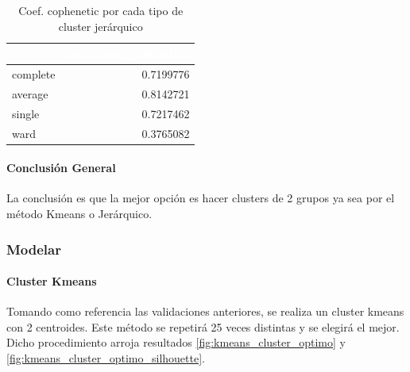 \begin{table}[!h]
	
	\caption{\label{tab:tabla_cophenetic_jerarquico}Coef. cophenetic por cada tipo de cluster jerárquico}
	\centering
	\begin{tabular}[t]{lr}
		\toprule
		\rowcolor{black}  \multicolumn{1}{c}{\textcolor{white}{\textbf{metodo}}} & \multicolumn{1}{c}{\textcolor{white}{\textbf{coeficiente\_cofenetico}}}\\
		\midrule
		\rowcolor{gray!6}  complete & 0.7199776\\
		average & 0.8142721\\
		\rowcolor{gray!6}  single & 0.7217462\\
		ward & 0.3765082\\
		\bottomrule
	\end{tabular}
\end{table}



\paragraph{\textbf{Conclusión General}}
La conclusión es que la mejor opción es hacer clusters de 2 grupos ya sea por el método Kmeans o Jerárquico.


\subsubsection{\textbf{Modelar}}

\paragraph{Cluster Kmeans}\label{cluster-kmeans}

Tomando como referencia las validaciones anteriores, se realiza un
cluster kmeans con 2 centroides. Este método se repetirá 25 veces
distintas y se elegirá el mejor.\\
Dicho procedimiento arroja resultados \ref{fig:kmeans_cluster_optimo} y \ref{fig:kmeans_cluster_optimo_silhouette}.

